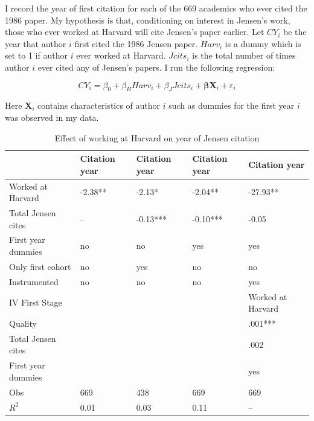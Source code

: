 I record the year of first citation for each of the 669 academics who
ever cited the 1986 paper. My hypothesis is that, conditioning on interest in
Jensen's work, those who ever worked at Harvard will cite Jensen's paper
earlier. Let $CY_i$ be the year that author $i$ first cited the 1986 Jensen paper.
$Harv_i$ is a dummy which is set to 1 if author $i$ ever worked at Harvard. 
$Jcits_i$ is the total number of times author $i$ ever cited any of Jensen's 
papers.  I run the following regression:

\begin{equation}
    CY_i = \beta_0 + \beta_H Harv_i + \beta_J Jcits_i + \mathbf{\beta} \mathbf{X}_i + \varepsilon_i
    \label{eq:jens_love}
\end{equation}

Here $\mathbf{X}_i$ contains characteristics of author $i$ such as dummies for
the first year $i$ was observed in my data.  


\begin{table}[!ht]
    \begin{tabular}{lllll}
        \hline
                           & Citation year & Citation year & Citation year & Citation year \\ \hline \hline
        Worked at Harvard  & -2.38**       & -2.13*        & -2.04**       & -27.93**      \\
        Total Jensen cites & --            & -0.13***      & -0.10***      & -0.05         \\
        First year dummies & no            & no            & yes           & yes           \\
        Only first cohort  & no            & yes           & no            & no            \\
        Instrumented       & no            & no            & no            & yes           \\ \hline
        IV First Stage     &               &               &               & Worked at Harvard \\ \hline
        Quality            &               &               &               & .001***       \\
        Total Jensen cites &               &               &               & .002          \\
        First year dummies &               &               &               & yes           \\ \hline
        Obs                & 669           & 438           & 669           & 669           \\
        $R^2$              & 0.01          & 0.03          & 0.11          & --            \\ \hline 

    \end{tabular}
    \caption{Effect of working at Harvard on year of Jensen citation}
    \label{tab:jens_love}
\end{table}

